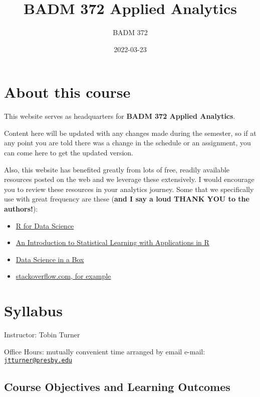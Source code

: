 \documentclass[
]{book}
\title{BADM 372 Applied Analytics}
\author{BADM 372}
\date{2022-03-23}
\providecommand{\tightlist}{%
  \setlength{\itemsep}{0pt}\setlength{\parskip}{0pt}}
\begin{document}
\maketitle

{
\setcounter{tocdepth}{1}
\tableofcontents
}
\hypertarget{about-this-course}{%
\chapter{About this course}\label{about-this-course}}

This website serves as headquarters for \textbf{BADM 372 Applied Analytics}.

Content here will be updated with any changes made during the semester, so if at any point you are told there was a change in the schedule or an assignment, you can come here to get the updated version.

Also, this website has benefited greatly from lots of free, readily available resources posted on the web and we leverage these extensively. I would encourage you to review these resources in your analytics journey. Some that we specifically use with great frequency are these (\textbf{and I say a loud THANK YOU to the authors!}):

\begin{itemize}
\tightlist
\item
  \href{https://r4ds.had.co.nz/}{R for Data Science}
\item
  \href{https://trevorhastie.github.io/ISLR/}{An Introduction to Statistical Learning with Applications in R}
\item
  \href{https://datasciencebox.org/}{Data Science in a Box}
\item
  \href{https://stackoverflow.com/questions/4862178/remove-rows-with-all-or-some-nas-missing-values-in-data-frame?rq=1}{stackoverflow.com, for example}
\end{itemize}

\hypertarget{syllabus}{%
\chapter{Syllabus}\label{syllabus}}

Instructor: Tobin Turner

Office Hours: mutually convenient time arranged by email e-mail: \href{mailto:jtturner@presby.edu}{\nolinkurl{jtturner@presby.edu}}

\hypertarget{course-objectives-and-learning-outcomes}{%
\section{Course Objectives and Learning Outcomes}\label{course-objectives-and-learning-outcomes}}
\end{document}
